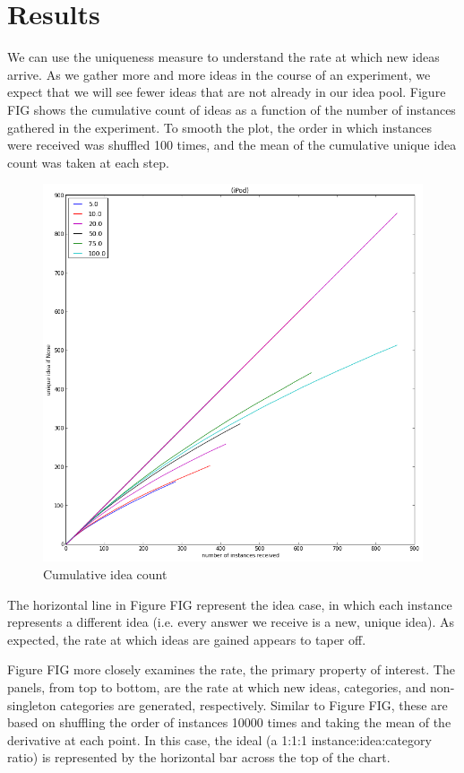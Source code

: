\section{Results}

We can use the uniqueness measure to understand the rate at which new ideas arrive. As we gather more and more ideas in the course of an experiment, we expect that we will see fewer ideas that are not already in our idea pool. Figure FIG shows the cumulative count of ideas as a function of the number of instances gathered in the experiment. To smooth the plot, the order in which instances were received was shuffled 100 times, and the mean of the cumulative unique idea count was taken at each step.

\begin{figure}[h!]
    \centering
    \includegraphics[width=0.9\columnwidth]{ideas_over_time}
    \caption{Cumulative idea count}
\end{figure}

The horizontal line in Figure FIG represent the idea case, in which each instance represents a different idea (i.e. every answer we receive is a new, unique idea). As expected, the rate at which ideas are gained appears to taper off.

Figure FIG more closely examines the rate, the primary property of interest. The panels, from top to bottom, are the rate at which new ideas, categories, and non-singleton categories are generated, respectively. Similar to Figure FIG, these are based on shuffling the order of instances 10000 times and taking the mean of the derivative at each point. In this case, the ideal (a 1:1:1 instance:idea:category ratio) is represented by the horizontal bar across the top of the chart.

